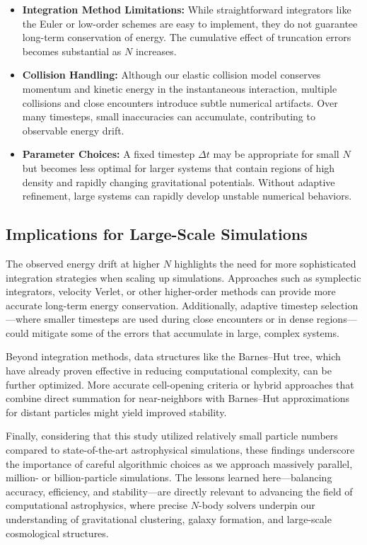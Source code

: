 \documentclass[a4paper, 12pt, oneside, onecolumn]{article}
\begin{document}
\begin{multicols}{2}
\begin{itemize}
    \item \textbf{Integration Method Limitations:} While straightforward integrators like the Euler or low-order schemes are easy to implement, they do not guarantee long-term conservation of energy. The cumulative effect of truncation errors becomes substantial as $N$ increases.
    \item \textbf{Collision Handling:} Although our elastic collision model conserves momentum and kinetic energy in the instantaneous interaction, multiple collisions and close encounters introduce subtle numerical artifacts. Over many timesteps, small inaccuracies can accumulate, contributing to observable energy drift.
    \item \textbf{Parameter Choices:} A fixed timestep $\Delta t$ may be appropriate for small $N$ but becomes less optimal for larger systems that contain regions of high density and rapidly changing gravitational potentials. Without adaptive refinement, large systems can rapidly develop unstable numerical behaviors.
\end{itemize}

\subsection*{Implications for Large-Scale Simulations}

The observed energy drift at higher $N$ highlights the need for more sophisticated integration strategies when scaling up simulations. Approaches such as symplectic integrators, velocity Verlet, or other higher-order methods can provide more accurate long-term energy conservation. Additionally, adaptive timestep selection—where smaller timesteps are used during close encounters or in dense regions—could mitigate some of the errors that accumulate in large, complex systems.

Beyond integration methods, data structures like the Barnes–Hut tree, which have already proven effective in reducing computational complexity, can be further optimized. More accurate cell-opening criteria or hybrid approaches that combine direct summation for near-neighbors with Barnes–Hut approximations for distant particles might yield improved stability.

Finally, considering that this study utilized relatively small particle numbers compared to state-of-the-art astrophysical simulations, these findings underscore the importance of careful algorithmic choices as we approach massively parallel, million- or billion-particle simulations. The lessons learned here—balancing accuracy, efficiency, and stability—are directly relevant to advancing the field of computational astrophysics, where precise $N$-body solvers underpin our understanding of gravitational clustering, galaxy formation, and large-scale cosmological structures.


\end{multicols}
\end{document}
